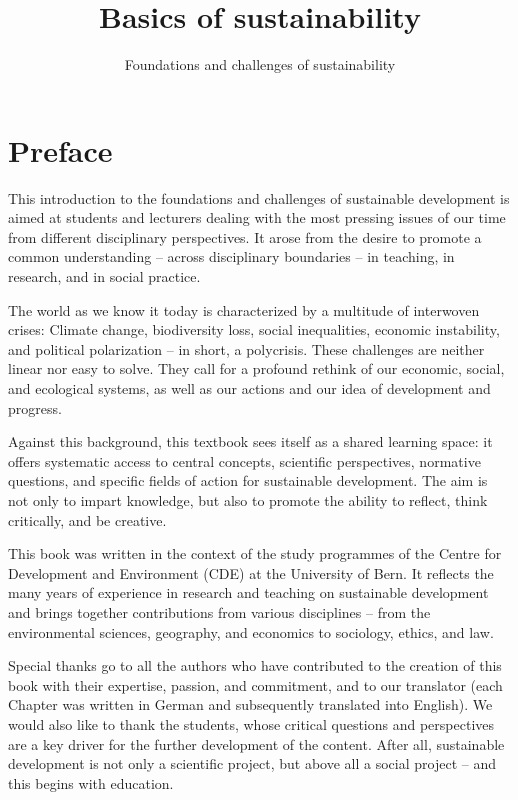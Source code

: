 \documentclass[
  a4paper,
  DIV=11,
  numbers=noendperiod,
  oneside,
  openany]{scrreprt}
\title{Basics of sustainability}
\subtitle{Foundations and challenges of sustainability}
\author{}
\date{}
\renewcommand{\maketitle}{}
\renewcommand*\contentsname{Table of contents}
\newcommand\contentsname{Table of contents}
\begin{document}
\maketitle



\renewcommand*\contentsname{Table of contents}
{
\setcounter{tocdepth}{2}
\tableofcontents
}


\chapter*{Preface}\label{preface}


This introduction to the foundations and challenges of sustainable
development is aimed at students and lecturers dealing with the most
pressing issues of our time from different disciplinary perspectives. It
arose from the desire to promote a common understanding -- across
disciplinary boundaries -- in teaching, in research, and in social
practice.

The world as we know it today is characterized by a multitude of
interwoven crises: Climate change, biodiversity loss, social
inequalities, economic instability, and political polarization -- in
short, a polycrisis. These challenges are neither linear nor easy to
solve. They call for a profound rethink of our economic, social, and
ecological systems, as well as our actions and our idea of development
and progress.

Against this background, this textbook sees itself as a shared learning
space: it offers systematic access to central concepts, scientific
perspectives, normative questions, and specific fields of action for
sustainable development. The aim is not only to impart knowledge, but
also to promote the ability to reflect, think critically, and be
creative.

This book was written in the context of the study programmes of the
Centre for Development and Environment (CDE) at the University of Bern.
It reflects the many years of experience in research and teaching on
sustainable development and brings together contributions from various
disciplines -- from the environmental sciences, geography, and economics
to sociology, ethics, and law.

Special thanks go to all the authors who have contributed to the
creation of this book with their expertise, passion, and commitment, and
to our translator (each Chapter was written in German and subsequently
translated into English). We would also like to thank the students,
whose critical questions and perspectives are a key driver for the
further development of the content. After all, sustainable development
is not only a scientific project, but above all a social project -- and
this begins with education.
\end{document}
